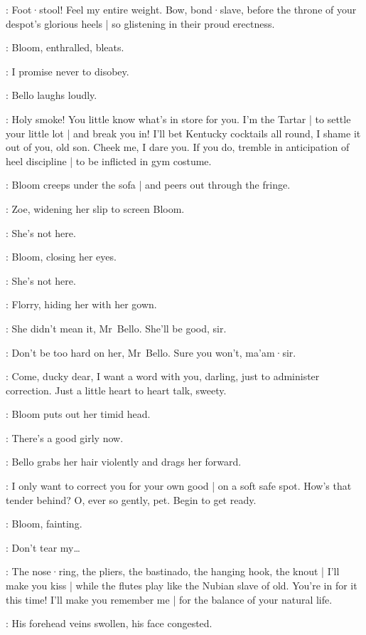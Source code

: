 \Bello:
Foot·stool!
Feel my entire weight.
Bow,
bond·slave,
before the throne of your despot's glorious heels |
so glistening in their proud erectness.

:
Bloom,
enthralled,
bleats.

\Bloom:
I promise never to disobey.

:
Bello laughs loudly.

\Bello:
Holy smoke!
You little know what's in store for you.
I'm the Tartar |
to settle your little lot  |
and break you in!
I'll bet Kentucky cocktails all round,
I shame it out of you,
old son.
Cheek me,
I dare you.
If you do,
tremble in anticipation of heel discipline |
to be inflicted in gym costume.%

:
Bloom creeps under the sofa |
and peers out through the fringe.

:
Zoe,
widening her slip to screen Bloom.

\Zoe:
She's not here.

:
Bloom,
closing her eyes.

\Bloom:
She's not here.

:
Florry,
hiding her with her gown.

\Florry:
She didn't mean it,
Mr~Bello.
She'll be good,
sir.

\Kitty:
Don't be too hard on her,
Mr~Bello.
%
Sure you won't,
ma'am·sir.

\Bello:
Come,
ducky dear,
I want a word with you,
darling,
just to administer correction.
Just a little heart to heart talk,
sweety.

:
Bloom puts out her timid head.

\Bello:
There's a good girly now.

:
Bello grabs her hair violently and drags her forward.

\Bello:
I only want to correct you for your own good |
on a soft safe spot.
How's that tender behind?
O,
ever so gently,
pet.
Begin to get ready.

:
Bloom,
fainting.

\Bloom:
Don't tear my…

\Bello:
The nose·ring,
the pliers,
the bastinado,
the hanging hook,
the knout |
I'll make you kiss |
while the flutes play like the Nubian slave of old.
You're in for it this time!
I'll make you remember me |
for the balance of your natural life.

:
His forehead veins swollen,
his face congested.

